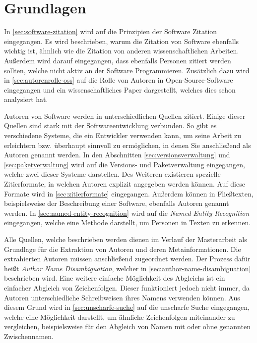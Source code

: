 \chapter{Grundlagen}
\label{chap:grundlagen}
In \autoref{sec:software-zitation} wird auf die Prinzipien der Software Zitation eingegangen.
Es wird beschrieben, warum die Zitation von Software ebenfalls wichtig ist, ähnlich wie die Zitation von anderen wissenschaftlichen Arbeiten.
Außerdem wird darauf eingegangen, dass ebenfalls Personen zitiert werden sollten, welche nicht aktiv an der Software Programmieren.
Zusätzlich dazu wird in \autoref{sec:autorenrolle-oss} auf die Rolle von Autoren in Open-Source-Software eingegangen und ein wissenschaftliches Paper dargestellt, welches dies schon analysiert hat.

Autoren von Software werden in unterschiedlichen Quellen zitiert.
Einige dieser Quellen sind stark mit der Softwareentwicklung verbunden.
So gibt es verschiedene Systeme, die ein Entwickler verwenden kann, um seine Arbeit zu erleichtern bzw. überhaupt sinnvoll zu ermöglichen, in denen Sie anschließend als Autoren genannt werden.
In den Abschnitten \ref{sec:versionsverwaltung} und \ref{sec:paketverwaltung} wird auf die Versions- und Paketverwaltung eingegangen, welche zwei dieser Systeme darstellen.
Des Weiteren existieren spezielle Zitierformate, in welchen Autoren explizit angegeben werden können.
Auf diese Formate wird in \autoref{sec:zitierformate} eingegangen.
Außerdem können in Fließtexten, beispielsweise der Beschreibung einer Software, ebenfalls Autoren genannt werden.
In \autoref{sec:named-entity-recognition} wird auf die \emph{Named Entity Recognition} eingegangen, welche eine Methode darstellt, um Personen in Texten zu erkennen.

Alle Quellen, welche beschrieben werden dienen im Verlauf der Masterarbeit als Grundlage für die Extraktion von Autoren und deren Metainformationen.
Die extrahierten Autoren müssen anschließend zugeordnet werden.
Der Prozess dafür heißt \emph{Author Name Disambiguation}, welcher in \autoref{sec:author-name-disambiguation} beschrieben wird.
Eine weitere einfache Möglichkeit des Abgleichs ist ein einfacher Abgleich von Zeichenfolgen.
Dieser funktioniert jedoch nicht immer, da Autoren unterschiedliche Schreibweisen ihres Namens verwenden können.
Aus diesem Grund wird in \autoref{sec:unscharfe-suche} auf die unscharfe Suche eingegangen, welche eine Möglichkeit darstellt, um ähnliche Zeichenfolgen miteinander zu vergleichen, beispielsweise für den Abgleich von Namen mit oder ohne genannten Zwischennamen.








